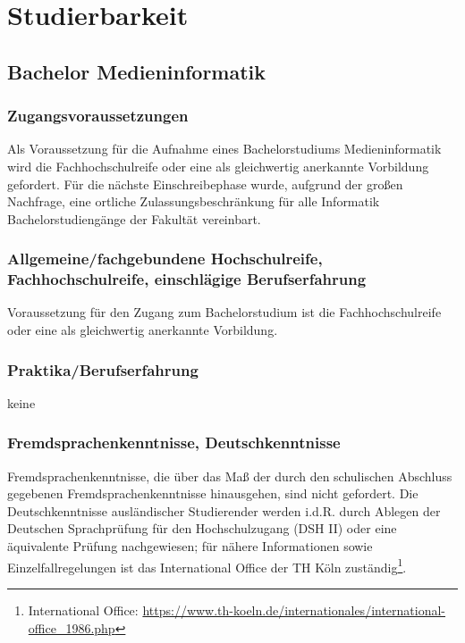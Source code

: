 \chapter{Studierbarkeit}\label{studierbarkeit}

\section{Bachelor
Medieninformatik}\label{bachelor-medieninformatik-1}

\subsection{Zugangsvoraussetzungen}\label{zugangsvoraussetzungen}

Als Voraussetzung für die Aufnahme eines Bachelorstudiums
Medieninformatik wird die Fachhochschulreife oder eine als gleichwertig
anerkannte Vorbildung gefordert. Für die nächste Einschreibephase wurde,
aufgrund der großen Nachfrage, eine ortliche Zulassungsbeschränkung für
alle Informatik Bachelorstudiengänge der Fakultät vereinbart.

\subsection{Allgemeine/fachgebundene Hochschulreife,
Fachhochschulreife, einschlägige
Berufserfahrung}\label{allgemeinefachgebundene-hochschulreife-fachhochschulreife-einschluxe4gige-berufserfahrung}

Voraussetzung für den Zugang zum Bachelorstudium ist die
Fachhochschulreife oder eine als gleichwertig anerkannte Vorbildung.

\subsection{Praktika/Berufserfahrung}\label{praktikaberufserfahrung}

keine

\subsection{Fremdsprachenkenntnisse,
Deutschkenntnisse}\label{fremdsprachenkenntnisse-deutschkenntnisse}

Fremdsprachenkenntnisse, die über das Maß der durch den schulischen
Abschluss gegebenen Fremdsprachenkenntnisse hinausgehen, sind nicht
gefordert. Die Deutschkenntnisse ausländischer Studierender werden
i.d.R. durch Ablegen der Deutschen Sprachprüfung für den Hochschulzugang
(DSH II) oder eine äquivalente Prüfung nachgewiesen; für nähere
Informationen sowie Einzelfallregelungen ist das International Office
der TH Köln zuständig\footnote{International Office:
  \url{https://www.th-koeln.de/internationales/international-office\_1986.php}}.

